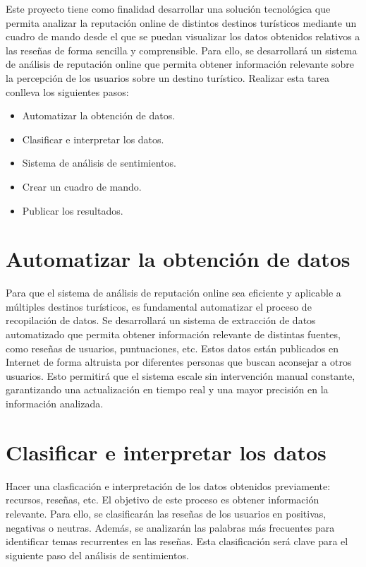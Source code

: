 
Este proyecto tiene como finalidad desarrollar una solución tecnológica que permita analizar la reputación online de distintos destinos turísticos 
mediante un cuadro de mando desde el que se puedan visualizar los datos obtenidos relativos a las reseñas de forma sencilla y comprensible.
Para ello, se desarrollará un sistema de análisis de reputación online que permita obtener información relevante sobre la percepción de los usuarios sobre un destino turístico.
Realizar esta tarea conlleva los siguientes pasos:

\begin{itemize}
    \item Automatizar la obtención de datos.
    \item Clasificar e interpretar los datos.
    \item Sistema de análisis de sentimientos.
    \item Crear un cuadro de mando.
    \item Publicar los resultados.
\end{itemize}

\section {Automatizar la obtención de datos}
 
Para que el sistema de análisis de reputación online sea eficiente y aplicable a múltiples destinos turísticos, es fundamental automatizar el proceso de recopilación de datos.
Se desarrollará un sistema de extracción de datos automatizado que permita obtener información relevante de distintas fuentes, como reseñas de usuarios, puntuaciones, etc. 
Estos datos están publicados en Internet de forma altruista por diferentes personas que buscan aconsejar a otros usuarios.
Esto permitirá que el sistema escale sin intervención manual constante, garantizando una actualización en tiempo real y una mayor precisión en la información analizada.

\section {Clasificar e interpretar los datos}
Hacer una clasficación e interpretación de los datos obtenidos previamente: recursos, reseñas, etc. El objetivo de este proceso es obtener información relevante.
Para ello, se clasificarán las reseñas de los usuarios en positivas, negativas o neutras.
Además, se analizarán las palabras más frecuentes para identificar temas recurrentes en las reseñas. 
Esta clasificación será clave para el siguiente paso del análisis de sentimientos.

